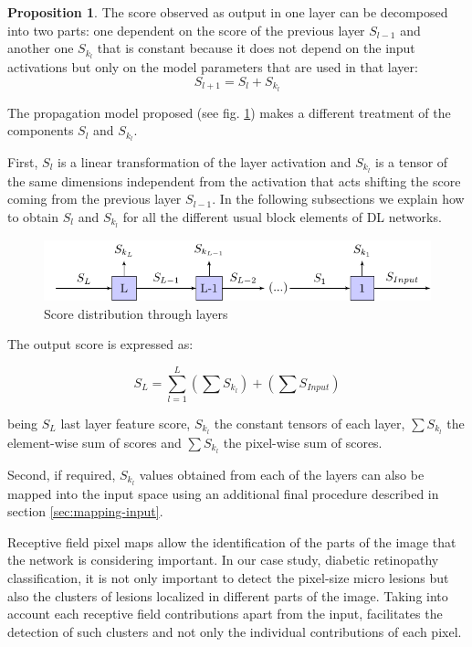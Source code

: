 \documentclass[review]{elsarticle}
\theoremstyle{definition} %
\newtheorem{proposition}{Proposition}%
\theoremstyle{remark}
\begin{document}
\begin{proposition}
	The score observed as output in one layer can be decomposed into two parts: one dependent on the score of the previous layer $S_{l-1}$ and another one $S_{k_l}$  that is constant because it does not depend on the input activations but only on the model parameters that are used in that layer:
	\begin{equation}
	S_{l+1} = S_{l} + S_{k_l}
	\end{equation}
\end{proposition}

The propagation model proposed (see fig. \ref{fig:score_map}) makes a different treatment of the components $S_l$ and $S_{k_l}$. 

First, $S_l$ is a linear transformation of the layer activation and $S_{k_l}$ is a tensor of the same dimensions independent from the activation that acts shifting the score coming from the previous layer $S_{l-1}$. In the following subsections we explain how to obtain $S_l$ and $S_{k_l}$ for all the different usual block elements of DL networks.

\begin{figure}[h!]
	\centering
	\includegraphics{figures/score_map.pdf}
	\caption{Score distribution through layers}
	\label{fig:score_map}
\end{figure}

The output score is expressed as:

\begin{equation}
S_L = \sum_{l=1}^L \left ( \sum S_{k_l} \right ) + \left ( \sum S_{Input} \right )
\end{equation}

being $S_L$ last layer feature score, $S_{k_l}$ the constant tensors of each layer, $\sum S_{k_l}$ the element-wise sum of scores and $\sum S_{k_l}$ the pixel-wise sum of scores.

Second, if required, $S_{k_l}$ values obtained from each of the layers can also be mapped into the input space using an additional final procedure described in section \ref{sec:mapping-input}.

Receptive field pixel maps allow the identification of the parts of the image that the network is considering important. In our case study, diabetic retinopathy classification, it is not only important to detect the pixel-size micro lesions but also the clusters of lesions localized in different parts of the image. Taking into account each receptive field contributions apart from the input, facilitates the detection of such clusters and not only the individual contributions of each pixel. 
\end{document}

